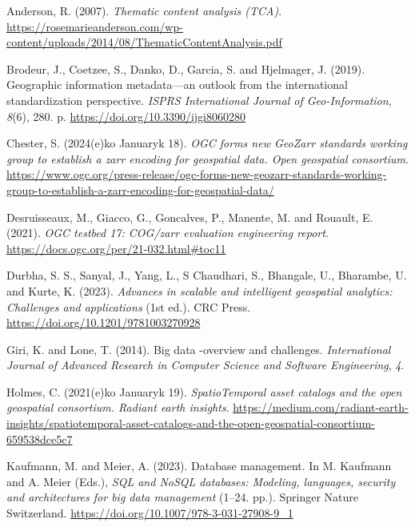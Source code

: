 \documentclass[
  oneside,
  open=any]{scrbook}
\newlength{\cslhangindent}
\newenvironment{CSLReferences}[2] %
 {\begin{list}{}{%
  \setlength{\itemindent}{0pt}
  \setlength{\leftmargin}{0pt}
  \setlength{\parsep}{0pt}
  \ifodd #1
   \setlength{\leftmargin}{\cslhangindent}
   \setlength{\itemindent}{-1\cslhangindent}
  \fi
  \setlength{\itemsep}{#2\baselineskip}}}
 {\end{list}}
\begin{document}
\label{refs}
\begin{CSLReferences}{1}{0}
Anderson, R. (2007). \emph{Thematic content analysis ({TCA})}.
\url{https://rosemarieanderson.com/wp-content/uploads/2014/08/ThematicContentAnalysis.pdf}

Brodeur, J., Coetzee, S., Danko, D., Garcia, S. and Hjelmager, J.
(2019). Geographic information metadata---an outlook from the
international standardization perspective. \emph{{ISPRS} International
Journal of Geo-Information}, \emph{8}(6), 280. p.
\url{https://doi.org/10.3390/ijgi8060280}

Chester, S. (2024(e)ko Januaryk 18). \emph{{OGC} forms new {GeoZarr}
standards working group to establish a zarr encoding for geospatial
data. Open geospatial consortium}.
\url{https://www.ogc.org/press-release/ogc-forms-new-geozarr-standards-working-group-to-establish-a-zarr-encoding-for-geospatial-data/}

Desruisseaux, M., Giacco, G., Goncalves, P., Manente, M. and Rouault, E.
(2021). \emph{{OGC} testbed 17: {COG}/zarr evaluation engineering
report}. \url{https://docs.ogc.org/per/21-032.html\#toc11}

Durbha, S. S., Sanyal, J., Yang, L., S Chaudhari, S., Bhangale, U.,
Bharambe, U. and Kurte, K. (2023). \emph{Advances in scalable and
intelligent geospatial analytics: Challenges and applications} (1st
ed.). {CRC} Press. \url{https://doi.org/10.1201/9781003270928}

Giri, K. and Lone, T. (2014). Big data -overview and challenges.
\emph{International Journal of Advanced Research in Computer Science and
Software Engineering}, \emph{4}.

Holmes, C. (2021(e)ko Januaryk 19). \emph{{SpatioTemporal} asset
catalogs and the open geospatial consortium. Radiant earth insights}.
\url{https://medium.com/radiant-earth-insights/spatiotemporal-asset-catalogs-and-the-open-geospatial-consortium-659538dce5c7}

Kaufmann, M. and Meier, A. (2023). Database management. In M. Kaufmann
and A. Meier (Eds.), \emph{{SQL} and {NoSQL} databases: Modeling,
languages, security and architectures for big data management} (1--24.
pp.). Springer Nature Switzerland.
\url{https://doi.org/10.1007/978-3-031-27908-9_1}


\end{CSLReferences}
\end{document}
